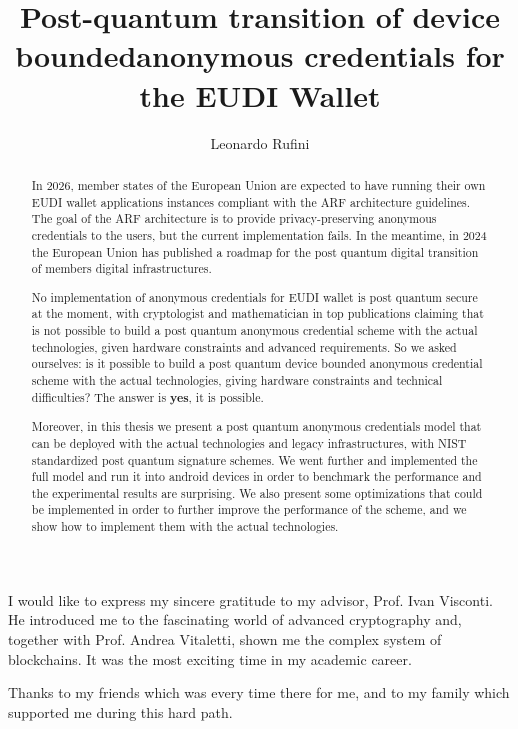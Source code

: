 \documentclass[binding=0.6cm,oneside,noexaminfo]{sapthesis}
\title{Post-quantum transition of device bounded\newline anonymous credentials for the EUDI Wallet}
\author{Leonardo Rufini}
\begin{document}
\frontmatter

\maketitle


\begin{acknowledgments}
\label{acknowledgments}
I would like to express my sincere gratitude to my advisor, Prof. Ivan Visconti.
He introduced me to the fascinating world of advanced cryptography and, 
together with Prof. Andrea Vitaletti, shown me the complex system of blockchains.
It was the most exciting time in my academic career.\newline

Thanks to my friends which was every time there for me, and to my family which 
supported me during this hard path.

\end{acknowledgments}


\begin{abstract}
\label{abstract}
In 2026, member states of the European Union are expected to have running
their own EUDI wallet applications instances compliant with the ARF
architecture guidelines. The goal of the ARF architecture is to provide privacy-preserving 
anonymous credentials to the users, but the current implementation fails.
In the meantime, in 2024 the European Union has published a roadmap for the post 
quantum digital transition of members digital infrastructures.

No implementation of anonymous credentials for EUDI wallet is post quantum secure at the moment,
with cryptologist and mathematician in top publications claiming that is not possible to
build a post quantum anonymous credential scheme with the actual technologies, given
hardware constraints and advanced requirements. So we asked ourselves: is it 
possible to build a post quantum device bounded anonymous credential scheme with the actual technologies, 
giving hardware constraints and technical difficulties? The answer is \textbf{yes}, it is
possible. 

Moreover, in this thesis we present a post quantum anonymous credentials model 
that can be deployed with the actual technologies and legacy infrastructures, with 
NIST standardized post quantum signature schemes. We went further and implemented the full
model and run it into android devices in order to benchmark the performance and the experimental
results
are surprising. We also present some optimizations that could be implemented in order to 
further improve the performance of the scheme, and we show how to implement them with the 
actual technologies.

\end{abstract}
\end{document}

